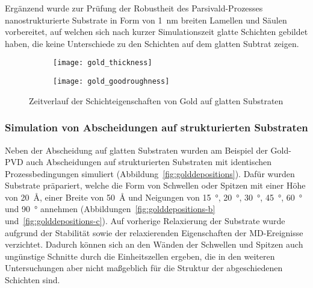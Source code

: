 Ergänzend wurde zur Prüfung der Robustheit des Parsivald-Prozesses nanostrukturierte Substrate in Form von \SI{1}{\nano\meter} breiten Lamellen und Säulen vorbereitet, auf welchen sich nach kurzer Simulationszeit glatte Schichten gebildet haben, die keine Unterschiede zu den Schichten auf dem glatten Subtrat zeigen.

\begin{figure}[thp]
  \captionsetup[subfigure]{singlelinecheck=false}
  \def\subfigwidth{0.49\textwidth}

  \begin{subfigure}[t]{\subfigwidth}
    \texttt{[image: gold\_thickness]}
    \label{fig:goldsmooth-a}
  \end{subfigure}
  \hfill
  \begin{subfigure}[t]{\subfigwidth}
    \texttt{[image: gold\_goodroughness]}
    \label{fig:goldsmooth-b}
  \end{subfigure}

  \caption[Schichteigenschaften von Gold auf glatten Substraten]{
    Zeitverlauf der Schichteigenschaften von Gold auf glatten Substraten
  }
  \label{fig:goldsmooth}

\end{figure}

\subsubsection{Simulation von Abscheidungen auf strukturierten Substraten}

Neben der Abscheidung auf glatten Substraten wurden am Beispiel der Gold-PVD auch Abscheidungen auf strukturierten Substraten mit identischen Prozessbedingungen simuliert (Abbildung~\ref{fig:golddepositions}).
Dafür wurden Substrate präpariert, welche die Form von Schwellen oder Spitzen mit einer Höhe von \SI{20}{\angstrom}, einer Breite von \SI{50}{\angstrom} und Neigungen von \SI{15}{\degree}, \SI{20}{\degree}, \SI{30}{\degree}, \SI{45}{\degree}, \SI{60}{\degree} und \SI{90}{\degree} annehmen (Abbildungen~\ref{fig:golddepositions-b} und~\ref{fig:golddepositions-c}).
Auf vorherige Relaxierung der Substrate wurde aufgrund der Stabilität sowie der relaxierenden Eigenschaften der MD-Ereignisse verzichtet.
Dadurch können sich an den Wänden der Schwellen und Spitzen auch ungünstige Schnitte durch die Einheitszellen ergeben, die in den weiteren Untersuchungen aber nicht maßgeblich für die Struktur der abgeschiedenen Schichten sind.

